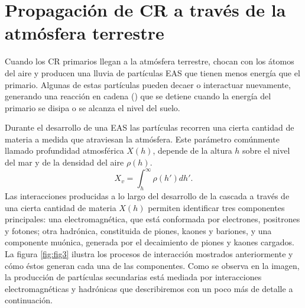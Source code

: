 \section{Propagación de CR a través de la atmósfera terrestre}

Cuando los CR primarios llegan a la atmósfera terrestre, chocan con los átomos del aire y producen una lluvia de partículas EAS que tienen menos energía que el primario. Algunas de estas partículas pueden decaer o interactuar nuevamente, generando una reacción en cadena (\cite{gaisser1990}) que se detiene cuando la energía del primario se disipa o se alcanza el nivel del suelo.

Durante el desarrollo de una EAS las partículas recorren una cierta cantidad de materia a medida que atraviesan la atmósfera. Este parámetro comúnmente llamado profundidad atmosférica $X(h)$, depende de la altura $h$ sobre el nivel del mar y de la densidad del aire $\rho(h)$.  
\begin{equation}
X_{v}= \int_{h}^{\infty} \rho (h') dh'.
\label{eq:eq2}
\end{equation}
Las interacciones producidas a lo largo del desarrollo de la cascada a través de una cierta cantidad de materia $X(h)$ permiten identificar tres componentes principales: una electromagnética, que está conformada por electrones, positrones y fotones; otra hadrónica, constituida de piones, kaones y bariones, y una componente muónica, generada por el decaimiento de piones y kaones cargados. La figura \ref{fig:fig3} ilustra los procesos de interacción mostrados anteriormente y cómo éstos generan cada una de las componentes. Como se observa en la imagen, la producción de partículas secundarias está mediada por interacciones electromagnéticas y hadrónicas que describiremos con un poco más de detalle a continuación.

